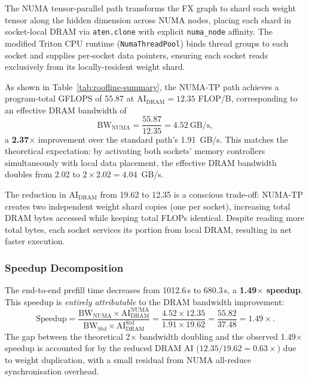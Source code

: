 The NUMA tensor-parallel path transforms the FX graph to shard each weight
tensor along the hidden dimension across NUMA nodes, placing each shard in
socket-local DRAM via \texttt{aten.clone} with explicit \texttt{numa\_node}
affinity.  The modified Triton CPU runtime (\texttt{NumaThreadPool}) binds
thread groups to each socket and supplies per-socket data pointers, ensuring
each socket reads exclusively from its locally-resident weight shard.

As shown in Table~\ref{tab:roofline-summary}, the NUMA-TP path achieves a
program-total GFLOPS of 55.87 at $\text{AI}_{\text{DRAM}}{=}12.35$ FLOP/B,
corresponding to an effective DRAM bandwidth of
\begin{equation}
  \text{BW}_{\text{NUMA}} = \frac{55.87}{12.35} = 4.52~\text{GB/s},
  \label{eq:bw-numa}
\end{equation}
a \textbf{2.37$\times$} improvement over the standard path's 1.91~GB/s.  This
matches the theoretical expectation: by activating both sockets' memory
controllers simultaneously with local data placement, the effective DRAM
bandwidth doubles from 2.02 to $2 \times 2.02 = 4.04$~GB/s.

The reduction in $\text{AI}_{\text{DRAM}}$ from 19.62 to 12.35 is a
conscious trade-off: NUMA-TP creates two independent weight shard copies (one
per socket), increasing total DRAM bytes accessed while keeping total FLOPs
identical.  Despite reading more total bytes, each socket services its portion
from local DRAM, resulting in net faster execution.

\subsubsection{Speedup Decomposition}
\label{subsubsec:speedup-decomposition}

The end-to-end prefill time decreases from 1012.6\,s to 680.3\,s, a
\textbf{1.49$\times$ speedup}.  This speedup is \emph{entirely attributable}
to the DRAM bandwidth improvement:
\begin{equation}
  \text{Speedup} = \frac{\text{BW}_{\text{NUMA}} \times
  \text{AI}_{\text{DRAM}}^{\text{NUMA}}}
  {\text{BW}_{\text{Std}} \times \text{AI}_{\text{DRAM}}^{\text{Std}}}
  = \frac{4.52 \times 12.35}{1.91 \times 19.62}
  = \frac{55.82}{37.48} = 1.49\times.
  \label{eq:speedup-decomp}
\end{equation}
The gap between the theoretical 2$\times$ bandwidth doubling and the observed
1.49$\times$ speedup is accounted for by the reduced DRAM AI
($12.35/19.62 = 0.63\times$) due to weight duplication, with a small residual
from NUMA all-reduce synchronisation overhead.

